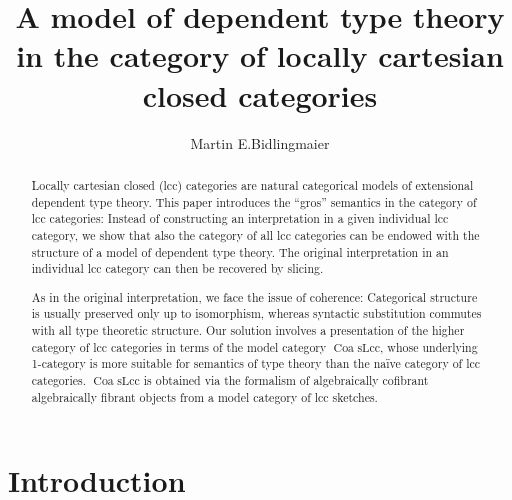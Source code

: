 \documentclass[a4paper]{article}
\theoremstyle{remark}
\theoremstyle{definition}
\begin{document}
\title{A model of dependent type theory in the category of locally cartesian closed categories}

\author{Martin E.\@ Bidlingmaier}

\maketitle

\begin{abstract}
  Locally cartesian closed (lcc) categories are natural categorical models of extensional dependent type theory.
  This paper introduces the ``gros'' semantics in the category of lcc categories:
  Instead of constructing an interpretation in a given individual lcc category, we show that also the category of all lcc categories can be endowed with the structure of a model of dependent type theory.
  The original interpretation in an individual lcc category can then be recovered by slicing.

  As in the original interpretation, we face the issue of coherence:
  Categorical structure is usually preserved only up to isomorphism, whereas syntactic substitution commutes with all type theoretic structure.
  Our solution involves a presentation of the higher category of lcc categories in terms of the model category $\operatorname{Coa} \mathrm{sLcc}$, whose underlying 1-category is more suitable for semantics of type theory than the naïve category of lcc categories.
  $\operatorname{Coa} \mathrm{sLcc}$ is obtained via the formalism of algebraically cofibrant algebraically fibrant objects from a model category of lcc sketches.
\end{abstract}

\section{Introduction}
\end{document}
